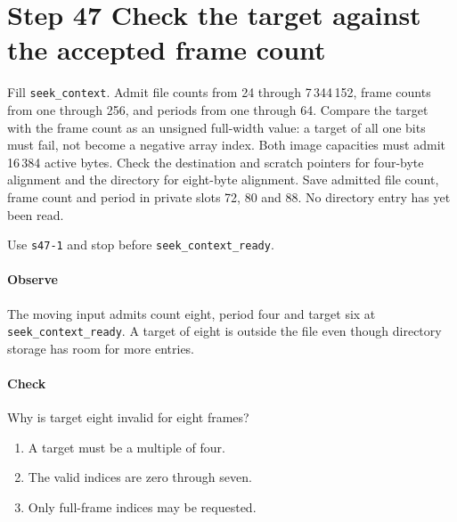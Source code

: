 \section{Step 47 Check the target against the accepted frame count}
Fill \texttt{seek\_context}. Admit file counts from 24 through 7\,344\,152, frame counts from one through 256, and periods from one through 64. Compare the target with the frame count as an unsigned full-width value: a target of all one bits must fail, not become a negative array index. Both image capacities must admit 16\,384 active bytes. Check the destination and scratch pointers for four-byte alignment and the directory for eight-byte alignment. Save admitted file count, frame count and period in private slots 72, 80 and 88. No directory entry has yet been read.

Use \texttt{s47-1} and stop before \texttt{seek\_context\_ready}.

\paragraph{Observe} The moving input admits count eight, period four and target six at \texttt{seek\_context\_ready}. A target of eight is outside the file even though directory storage has room for more entries.

\paragraph{Check} Why is target eight invalid for eight frames?
\begin{enumerate}[label=\Alph*.]
  \item A target must be a multiple of four.
  \item The valid indices are zero through seven.
  \item Only full-frame indices may be requested.
\end{enumerate}
